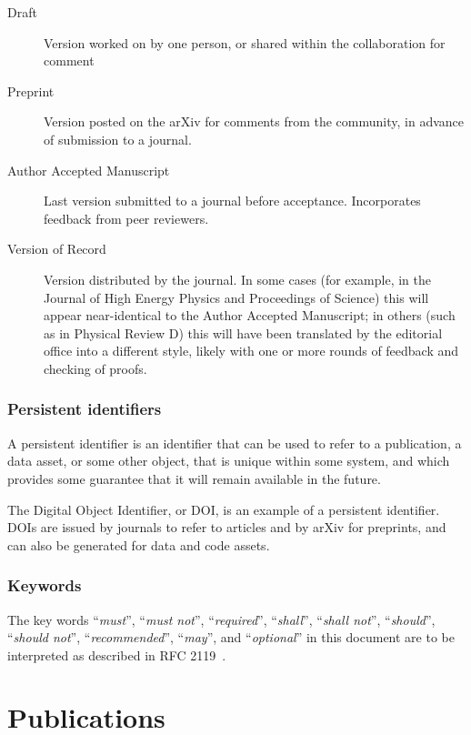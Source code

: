 \documentclass{article}
\newcommand\rfcword[1]{\emph{#1}\xspace}
\newcommand\must{\rfcword{must}}
\newcommand\mustnot{\rfcword{must not}}
\newcommand\required{\rfcword{required}}
\newcommand\shall{\rfcword{shall}}
\newcommand\shallnot{\rfcword{shall not}}
\newcommand\should{\rfcword{should}}
\newcommand\shouldnot{\rfcword{should not}}
\newcommand\recommended{\rfcword{recommended}}
\newcommand\may{\rfcword{may}}
\newcommand\optional{\rfcword{optional}}
\begin{document}
\begin{description}
  \item[Draft]
        Version worked on by one person,
        or shared within the collaboration for comment
  \item[Preprint]
        Version posted on the arXiv for comments from the community,
        in advance of submission to a journal.
  \item[Author Accepted Manuscript]
        Last version submitted to a journal before acceptance.
        Incorporates feedback from peer reviewers.
  \item[Version of Record]
        Version distributed by the journal.
        In some cases
        (for example,
        in the Journal of High Energy Physics
        and Proceedings of Science)
        this will appear near-identical to the Author Accepted Manuscript;
        in others
        (such as in Physical Review D)
        this will have been
        translated by the editorial office into a different style,
        likely with one or more rounds of feedback
        and checking of proofs.
\end{description}

\subsubsection{Persistent identifiers}

A persistent identifier is
an identifier that can be used to refer to
a publication,
a data asset,
or some other object,
that is unique within some system,
and which provides some guarantee that it will remain available in the future.

The Digital Object Identifier,
or DOI,
is an example of a persistent identifier.
DOIs are issued by journals to refer to articles
and by arXiv for preprints,
and can also be generated for data and code assets.


\subsubsection{Keywords}

The key words
``\must'',
``\mustnot'',
``\required'',
``\shall'',
``\shallnot'',
``\should'',
``\shouldnot'',
``\recommended'',
``\may'',
and ``\optional''
in this document are to be interpreted as described in RFC 2119~\cite{rfc2119}.



\section{Publications}
\label{sec:publications}
\end{document}
